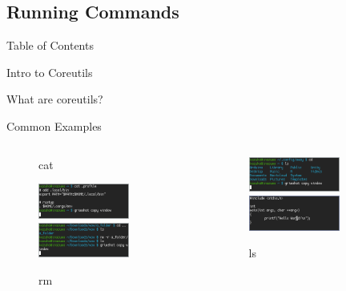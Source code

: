 \documentclass{beamer}
\begin{document}
\subsection{Running Commands}
\begin{frame}{Table of Contents}
	\tableofcontents[currentsection]
\end{frame}

\begin{frame}{Intro to Coreutils}
	\begin{center}
		\Huge What are coreutils?
	\end{center}
\end{frame}

\begin{frame}{Common Examples}
	\begin{columns}
		\begin{column}{0.33\textwidth}
			\begin{figure}
				\centering
				\caption{cat}
				\includegraphics[width=0.7\textwidth]{cat.png}
				\includegraphics[width=0.7\textwidth]{rm.png}
				\caption{rm}
			\end{figure}
		\end{column}
		\begin{column}{0.33\textwidth}
			\begin{figure}
				\centering
				\caption{ls}
				\includegraphics[width=0.7\textwidth]{ls.png}
				\includegraphics[width=0.7\textwidth]{vi.png}

\end{figure}
\end{column}
\end{columns}
\end{frame}
\end{document}
